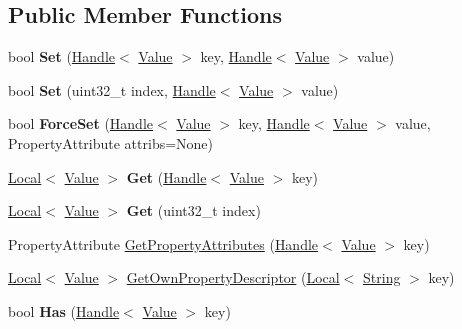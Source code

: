 \subsection*{Public Member Functions}
\begin{DoxyCompactItemize}
\item 
\hypertarget{classv8_1_1Object_ae219bb61093f88e018be06980e908ff9}{}bool {\bfseries Set} (\hyperlink{classv8_1_1Handle}{Handle}$<$ \hyperlink{classv8_1_1Value}{Value} $>$ key, \hyperlink{classv8_1_1Handle}{Handle}$<$ \hyperlink{classv8_1_1Value}{Value} $>$ value)\label{classv8_1_1Object_ae219bb61093f88e018be06980e908ff9}

\item 
\hypertarget{classv8_1_1Object_a5779059211f275447f433e7f8a859dd0}{}bool {\bfseries Set} (uint32\+\_\+t index, \hyperlink{classv8_1_1Handle}{Handle}$<$ \hyperlink{classv8_1_1Value}{Value} $>$ value)\label{classv8_1_1Object_a5779059211f275447f433e7f8a859dd0}

\item 
\hypertarget{classv8_1_1Object_aa89f3dce24a3a3431295218d24498c52}{}bool {\bfseries Force\+Set} (\hyperlink{classv8_1_1Handle}{Handle}$<$ \hyperlink{classv8_1_1Value}{Value} $>$ key, \hyperlink{classv8_1_1Handle}{Handle}$<$ \hyperlink{classv8_1_1Value}{Value} $>$ value, Property\+Attribute attribs=None)\label{classv8_1_1Object_aa89f3dce24a3a3431295218d24498c52}

\item 
\hypertarget{classv8_1_1Object_a976f0329ff7465c124652d633d469c06}{}\hyperlink{classv8_1_1Local}{Local}$<$ \hyperlink{classv8_1_1Value}{Value} $>$ {\bfseries Get} (\hyperlink{classv8_1_1Handle}{Handle}$<$ \hyperlink{classv8_1_1Value}{Value} $>$ key)\label{classv8_1_1Object_a976f0329ff7465c124652d633d469c06}

\item 
\hypertarget{classv8_1_1Object_aa494683803b31bcedab121929f4b0b17}{}\hyperlink{classv8_1_1Local}{Local}$<$ \hyperlink{classv8_1_1Value}{Value} $>$ {\bfseries Get} (uint32\+\_\+t index)\label{classv8_1_1Object_aa494683803b31bcedab121929f4b0b17}

\item 
Property\+Attribute \hyperlink{classv8_1_1Object_a45506d0a9192b023284b0211e9bf545b}{Get\+Property\+Attributes} (\hyperlink{classv8_1_1Handle}{Handle}$<$ \hyperlink{classv8_1_1Value}{Value} $>$ key)
\item 
\hyperlink{classv8_1_1Local}{Local}$<$ \hyperlink{classv8_1_1Value}{Value} $>$ \hyperlink{classv8_1_1Object_aece53e208f3a25b3d5d47cfc134db49a}{Get\+Own\+Property\+Descriptor} (\hyperlink{classv8_1_1Local}{Local}$<$ \hyperlink{classv8_1_1String}{String} $>$ key)
\item 
\hypertarget{classv8_1_1Object_a3548568db2a5baa80ffe17c02b3b4880}{}bool {\bfseries Has} (\hyperlink{classv8_1_1Handle}{Handle}$<$ \hyperlink{classv8_1_1Value}{Value} $>$ key)\label{classv8_1_1Object_a3548568db2a5baa80ffe17c02b3b4880}


\end{DoxyCompactItemize}
